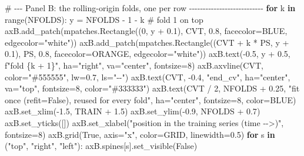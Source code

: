 \documentclass[
  english,
  letterpaper,
]{scrbook}
\newenvironment{Shaded}{\begin{snugshade}}{\end{snugshade}}
\newcommand{\BuiltInTok}[1]{\textcolor[rgb]{0.00,0.23,0.31}{#1}}
\newcommand{\CommentTok}[1]{\textcolor[rgb]{0.37,0.37,0.37}{#1}}
\newcommand{\ControlFlowTok}[1]{\textcolor[rgb]{0.00,0.23,0.31}{\textbf{#1}}}
\newcommand{\DecValTok}[1]{\textcolor[rgb]{0.68,0.00,0.00}{#1}}
\newcommand{\FloatTok}[1]{\textcolor[rgb]{0.68,0.00,0.00}{#1}}
\newcommand{\KeywordTok}[1]{\textcolor[rgb]{0.00,0.23,0.31}{\textbf{#1}}}
\newcommand{\NormalTok}[1]{\textcolor[rgb]{0.00,0.23,0.31}{#1}}
\newcommand{\OperatorTok}[1]{\textcolor[rgb]{0.37,0.37,0.37}{#1}}
\newcommand{\SpecialCharTok}[1]{\textcolor[rgb]{0.37,0.37,0.37}{#1}}
\newcommand{\SpecialStringTok}[1]{\textcolor[rgb]{0.13,0.47,0.30}{#1}}
\newcommand{\StringTok}[1]{\textcolor[rgb]{0.13,0.47,0.30}{#1}}
\newcommand{\VariableTok}[1]{\textcolor[rgb]{0.07,0.07,0.07}{#1}}
\begin{document}
\begin{Shaded}
\begin{Highlighting}[]
\CommentTok{\# {-}{-}{-} Panel B: the rolling{-}origin folds, one per row {-}{-}{-}{-}{-}{-}{-}{-}{-}{-}{-}{-}{-}{-}{-}{-}{-}{-}{-}{-}{-}{-}{-}{-}{-}{-}{-}}
\ControlFlowTok{for}\NormalTok{ k }\KeywordTok{in} \BuiltInTok{range}\NormalTok{(NFOLDS):}
\NormalTok{    y }\OperatorTok{=}\NormalTok{ NFOLDS }\OperatorTok{{-}} \DecValTok{1} \OperatorTok{{-}}\NormalTok{ k                       }\CommentTok{\# fold 1 on top}
\NormalTok{    axB.add\_patch(mpatches.Rectangle((}\DecValTok{0}\NormalTok{, y }\OperatorTok{+} \FloatTok{0.1}\NormalTok{), CVT, }\FloatTok{0.8}\NormalTok{, facecolor}\OperatorTok{=}\NormalTok{BLUE,}
\NormalTok{                                     edgecolor}\OperatorTok{=}\StringTok{"white"}\NormalTok{))}
\NormalTok{    axB.add\_patch(mpatches.Rectangle((CVT }\OperatorTok{+}\NormalTok{ k }\OperatorTok{*}\NormalTok{ PS, y }\OperatorTok{+} \FloatTok{0.1}\NormalTok{), PS, }\FloatTok{0.8}\NormalTok{,}
\NormalTok{                                     facecolor}\OperatorTok{=}\NormalTok{ORANGE, edgecolor}\OperatorTok{=}\StringTok{"white"}\NormalTok{))}
\NormalTok{    axB.text(}\OperatorTok{{-}}\FloatTok{0.5}\NormalTok{, y }\OperatorTok{+} \FloatTok{0.5}\NormalTok{, }\SpecialStringTok{f"fold }\SpecialCharTok{\{}\NormalTok{k }\OperatorTok{+} \DecValTok{1}\SpecialCharTok{\}}\SpecialStringTok{"}\NormalTok{, ha}\OperatorTok{=}\StringTok{"right"}\NormalTok{, va}\OperatorTok{=}\StringTok{"center"}\NormalTok{, fontsize}\OperatorTok{=}\DecValTok{8}\NormalTok{)}
\NormalTok{axB.axvline(CVT, color}\OperatorTok{=}\StringTok{"\#555555"}\NormalTok{, lw}\OperatorTok{=}\FloatTok{0.7}\NormalTok{, ls}\OperatorTok{=}\StringTok{"{-}{-}"}\NormalTok{)}
\NormalTok{axB.text(CVT, }\OperatorTok{{-}}\FloatTok{0.4}\NormalTok{, }\StringTok{"end\_cv"}\NormalTok{, ha}\OperatorTok{=}\StringTok{"center"}\NormalTok{, va}\OperatorTok{=}\StringTok{"top"}\NormalTok{, fontsize}\OperatorTok{=}\DecValTok{8}\NormalTok{, color}\OperatorTok{=}\StringTok{"\#333333"}\NormalTok{)}
\NormalTok{axB.text(CVT }\OperatorTok{/} \DecValTok{2}\NormalTok{, NFOLDS }\OperatorTok{+} \FloatTok{0.25}\NormalTok{, }\StringTok{"fit once (refit=False), reused for every fold"}\NormalTok{,}
\NormalTok{         ha}\OperatorTok{=}\StringTok{"center"}\NormalTok{, fontsize}\OperatorTok{=}\DecValTok{8}\NormalTok{, color}\OperatorTok{=}\NormalTok{BLUE)}
\NormalTok{axB.set\_xlim(}\OperatorTok{{-}}\FloatTok{1.5}\NormalTok{, TRAIN }\OperatorTok{+} \FloatTok{1.5}\NormalTok{)}
\NormalTok{axB.set\_ylim(}\OperatorTok{{-}}\FloatTok{0.9}\NormalTok{, NFOLDS }\OperatorTok{+} \FloatTok{0.7}\NormalTok{)}
\NormalTok{axB.set\_yticks([])}
\NormalTok{axB.set\_xlabel(}\StringTok{"position in the training series (time {-}{-}\textgreater{})"}\NormalTok{, fontsize}\OperatorTok{=}\DecValTok{8}\NormalTok{)}
\NormalTok{axB.grid(}\VariableTok{True}\NormalTok{, axis}\OperatorTok{=}\StringTok{"x"}\NormalTok{, color}\OperatorTok{=}\NormalTok{GRID, linewidth}\OperatorTok{=}\FloatTok{0.5}\NormalTok{)}
\ControlFlowTok{for}\NormalTok{ s }\KeywordTok{in}\NormalTok{ (}\StringTok{"top"}\NormalTok{, }\StringTok{"right"}\NormalTok{, }\StringTok{"left"}\NormalTok{):}
\NormalTok{    axB.spines[s].set\_visible(}\VariableTok{False}\NormalTok{)}


\end{Highlighting}
\end{Shaded}
\end{document}
